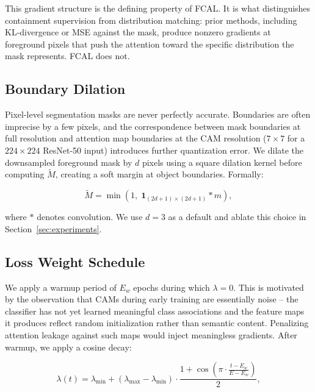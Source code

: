 \documentclass[journal]{IEEEtran}
\begin{document}
This gradient structure is the defining property of FCAL. It
is what distinguishes containment supervision from distribution
matching: prior methods, including KL-divergence or MSE against
the mask, produce nonzero gradients at foreground pixels that
push the attention toward the specific distribution the mask
represents. FCAL does not.

\subsection{Boundary Dilation}
\label{subsec:dilation}

Pixel-level segmentation masks are never perfectly accurate.
Boundaries are often imprecise by a few pixels, and the
correspondence between mask boundaries at full resolution and
attention map boundaries at the CAM resolution ($7 \times 7$
for a $224 \times 224$ ResNet-50 input) introduces further
quantization error. We dilate the downsampled foreground mask
by $d$ pixels using a square dilation kernel before computing
$\tilde{M}$, creating a soft margin at object boundaries.
Formally:

\begin{equation}
  \tilde{M} = \min\!\left(1,\;
    \mathbf{1}_{(2d+1) \times (2d+1)} * m\right),
  \label{eq:dilation}
\end{equation}

where $*$ denotes convolution. We use $d = 3$ as a default
and ablate this choice in Section~\ref{sec:experiments}.

\subsection{Loss Weight Schedule}
\label{subsec:schedule}

We apply a warmup period of $E_w$ epochs during which $\lambda = 0$.
This is motivated by the observation that CAMs during early
training are essentially noise -- the classifier has not yet learned
meaningful class associations and the feature maps it produces
reflect random initialization rather than semantic content.
Penalizing attention leakage against such maps would inject
meaningless gradients. After warmup, we apply a cosine decay:

\begin{equation}
  \lambda(t)
    = \lambda_{\min}
    + (\lambda_{\max} - \lambda_{\min})
      \cdot \frac{1 + \cos\!\left(\pi \cdot
        \frac{t - E_w}{E - E_w}\right)}{2},
  \label{eq:schedule}
\end{equation}
\end{document}
